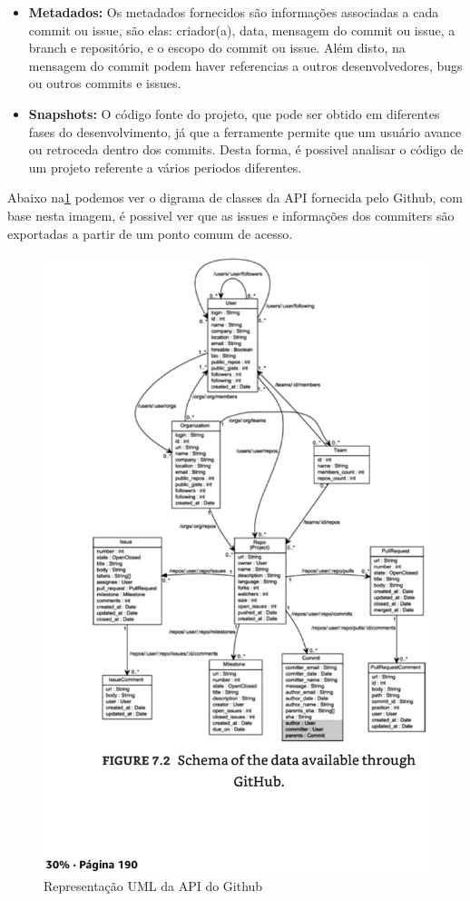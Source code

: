 \begin{itemize}
\item \textbf{Metadados:} Os metadados fornecidos são informações associadas a cada
commit ou issue, são elas: criador(a), data, mensagem do commit ou issue, a branch e repositório,
e o escopo do commit ou issue. Além disto, na mensagem do commit podem haver referencias a outros
desenvolvedores, bugs ou outros commits e issues.
\item \textbf{Snapshots:} O código fonte do projeto, que pode ser obtido em diferentes
fases do desenvolvimento, já que a ferramente permite que um usuário avance ou retroceda
dentro dos commits. Desta forma, é possivel analisar o código de um projeto referente
a vários periodos diferentes.
\end{itemize}

Abaixo na\ref{github_api} podemos ver o digrama de classes da API fornecida pelo
Github, com base nesta imagem, é possivel ver que as issues e informações dos commiters
são exportadas a partir de um ponto comum de acesso.

\begin{figure}[h]
    \centering
    \label{github_api}
        \includegraphics[keepaspectratio=true,scale=0.3]{figuras/github_api_diagram.eps}
    \caption{Representação UML da API do Github}
\end{figure}

